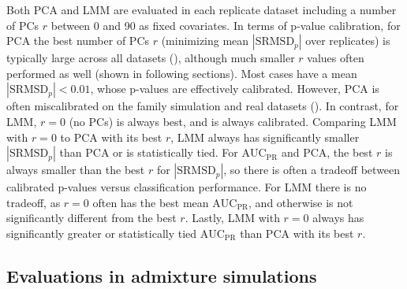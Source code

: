 \documentclass[9pt,lineno]{elife}
\newcommand{\rmsd}{\text{SRMSD}_p}
\newcommand{\auc}{\text{AUC}_\text{PR}}
\begin{document}
Both PCA and LMM are evaluated in each replicate dataset including a number of PCs $r$ between 0 and 90 as fixed covariates.
In terms of p-value calibration, for PCA the best number of PCs $r$ (minimizing mean $|\rmsd|$ over replicates) is typically large across all datasets (), although much smaller $r$ values often performed as well (shown in following sections).
Most cases have a mean $|\rmsd| < 0.01$, whose p-values are effectively calibrated.
However, PCA is often miscalibrated on the family simulation and real datasets ().
In contrast, for LMM, $r=0$ (no PCs) is always best, and is always calibrated.
Comparing LMM with $r=0$ to PCA with its best $r$, LMM always has significantly smaller $|\rmsd|$ than PCA or is statistically tied.
% 
For $\auc$ and PCA, the best $r$ is always smaller than the best $r$ for $|\rmsd|$, so there is often a tradeoff between calibrated p-values versus classification performance.
For LMM there is no tradeoff, as $r=0$ often has the best mean $\auc$, and otherwise is not significantly different from the best $r$.
Lastly, LMM with $r=0$ always has significantly greater or statistically tied $\auc$ than PCA with its best $r$.

\subsection{Evaluations in admixture simulations}
\end{document}
